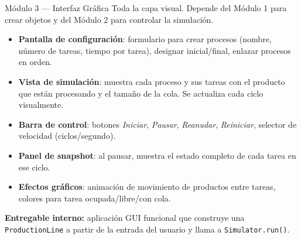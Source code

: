 \documentclass[12pt,letterpaper]{article}
\begin{document}
\begin{modbox}[mod3]{Módulo 3 --- Interfaz Gráfica}
Toda la capa visual. Depende del Módulo 1 para crear objetos y del Módulo 2 para controlar la simulación.

\begin{itemize}[leftmargin=1.5em, itemsep=2pt]
    \item \textbf{Pantalla de configuración}: formulario para crear procesos (nombre, número de tareas, tiempo por tarea), designar inicial/final, enlazar procesos en orden.
    \item \textbf{Vista de simulación}: muestra cada proceso y sus tareas con el producto que están procesando y el tamaño de la cola. Se actualiza cada ciclo visualmente.
    \item \textbf{Barra de control}: botones \emph{Iniciar}, \emph{Pausar}, \emph{Reanudar}, \emph{Reiniciar}, selector de velocidad (ciclos/segundo).
    \item \textbf{Panel de snapshot}: al pausar, muestra el estado completo de cada tarea en ese ciclo.
    \item \textbf{Efectos gráficos}: animación de movimiento de productos entre tareas, colores para tarea ocupada/libre/con cola.
\end{itemize}

\textbf{Entregable interno:} aplicación GUI funcional que construye una \texttt{ProductionLine} a partir de la entrada del usuario y llama a \texttt{Simulator.run()}.
\end{modbox}

\vspace{0.7em}
\end{document}
